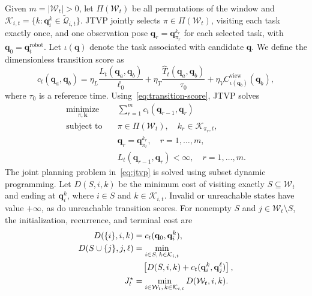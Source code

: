 \documentclass[letterpaper,10pt,journal]{IEEEtran}
\begin{document}
Given $m=|\mathcal W_t|>0$, let $\Pi(\mathcal W_t)$ be all permutations of the window and $\mathcal K_{i,t}=\{k:\mathbf q_i^k\in\widetilde{\mathcal Q}_{i,t}\}$. JTVP jointly selects $\pi\in\Pi(\mathcal W_t)$, visiting each task exactly once, and one observation pose $\mathbf{q}_r=\mathbf{q}_{\pi_r}^{k_r}$ for each selected task, with $\mathbf{q}_0=\mathbf{q}_t^{\mathrm{robot}}$. Let $\iota(\mathbf{q})$ denote the task associated with candidate $\mathbf{q}$. We define the dimensionless transition score as
\begin{equation}
c_t(\mathbf{q}_a,\mathbf{q}_b)=
\eta_L\frac{L_t(\mathbf{q}_a,\mathbf{q}_b)}{\ell_0}
+\eta_T\frac{\widehat T_t(\mathbf{q}_a,\mathbf{q}_b)}{\tau_0}
+\eta_V C_{\iota(\mathbf{q}_b)}^{\mathrm{view}}(\mathbf{q}_b),
\label{eq:transition-score}
\end{equation}
where $\tau_0$ is a reference time. Using~\eqref{eq:transition-score}, JTVP solves
\begin{equation}
\begin{aligned}
\underset{\pi,\mathbf{k}}{\operatorname{minimize}}\quad
&\sum_{r=1}^{m}c_t(\mathbf{q}_{r-1},\mathbf{q}_r)\\
\operatorname{subject\ to}\quad
&\pi\in\Pi(\mathcal W_t),\quad k_r\in\mathcal K_{\pi_r,t},\\
&\mathbf q_r=\mathbf q_{\pi_r}^{k_r},\quad r=1,\ldots,m,\\
&L_t(\mathbf{q}_{r-1},\mathbf{q}_r)<\infty,\quad r=1,\ldots,m.
\end{aligned}
\label{eq:jtvp}
\end{equation}
The joint planning problem in~\eqref{eq:jtvp} is solved using subset dynamic programming. Let $D(S,i,k)$ be the minimum cost of visiting exactly $S\subseteq\mathcal W_t$ and ending at $\mathbf q_i^k$, where $i\in S$ and $k\in\mathcal K_{i,t}$. Invalid or unreachable states have value $+\infty$, as do unreachable transition scores. For nonempty $S$ and $j\in\mathcal W_t\setminus S$, the initialization, recurrence, and terminal cost are
\begin{subequations}\label{eq:subset-dp}
\begin{align}
D(\{i\},i,k)&=c_t(\mathbf{q}_0,\mathbf{q}_i^k),
\label{eq:dp-init}\\
D(S\cup\{j\},j,\ell)&=
\min_{\substack{i\in S,\,k\in\mathcal K_{i,t}}}\notag\\
&\quad\left[D(S,i,k)+c_t(\mathbf{q}_i^k,\mathbf{q}_j^\ell)\right],
\label{eq:dp-recurrence}\\
J_t^\star&=\min_{\substack{i\in\mathcal W_t,\,k\in\mathcal K_{i,t}}}
D(\mathcal W_t,i,k).
\label{eq:dp-terminal}
\end{align}
\end{subequations}
\end{document}
